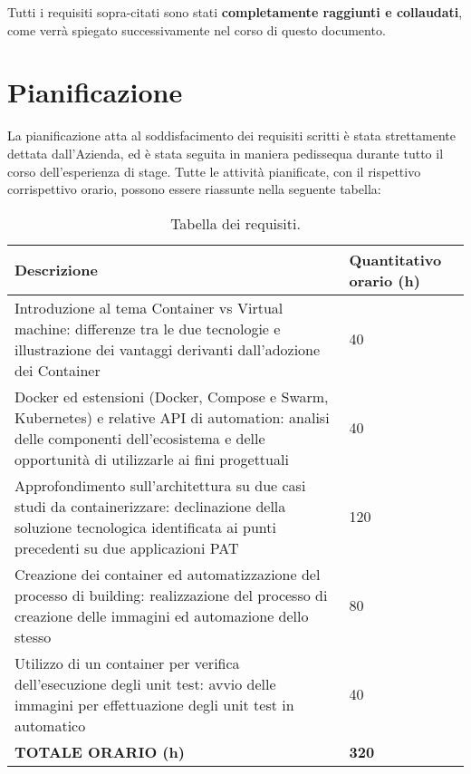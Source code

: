 Tutti i requisiti sopra-citati sono stati \textbf{completamente raggiunti e collaudati}, come verrà spiegato successivamente nel corso di questo documento.

\newpage
\section{Pianificazione}
La pianificazione atta al soddisfacimento dei requisiti scritti è stata strettamente dettata dall'Azienda, ed è stata seguita in maniera pedissequa durante tutto il corso dell'esperienza di stage.
Tutte le attività pianificate, con il rispettivo corrispettivo orario, possono essere riassunte nella seguente tabella:
\begin{table}[h!]
\centering
    \renewcommand{\arraystretch}{1.5}
    \begin{tabular}{|m{25em} | m{}|} 
    \hline
        \hfil \textbf{Descrizione} & \hfil \textbf{Quantitativo orario (h)} \\
    \hline\hline
        \hfil  Introduzione al tema Container vs Virtual machine: differenze tra le due tecnologie e illustrazione dei vantaggi derivanti dall'adozione dei Container & 40 \\ 
    \hline
       \hfil Docker ed estensioni (Docker, Compose e Swarm, Kubernetes) e relative API di automation: analisi delle componenti dell'ecosistema e delle opportunità di utilizzarle ai fini progettuali & 40 \\
    \hline
        \hfil Approfondimento sull'architettura su due casi studi da containerizzare: declinazione della soluzione tecnologica identificata ai punti precedenti su due applicazioni PAT & 120 \\
    \hline
        \hfil  Creazione dei container ed automatizzazione del processo di building: realizzazione del processo di creazione delle immagini ed automazione dello stesso & 80 \\
    \hline
        \hfil  Utilizzo di un container per verifica dell'esecuzione degli unit test: avvio delle immagini per effettuazione degli unit test in automatico & 40 \\ [1ex] 
   \hline
    \textbf{TOTALE ORARIO (h)} & \textbf{320}\\
    \hline
    \end{tabular}
\medskip
\caption{Tabella dei requisiti.}
\label{table:tabella dei requisiti in relazione al tempo stabiliti dall'Azienda}
\end{table}





